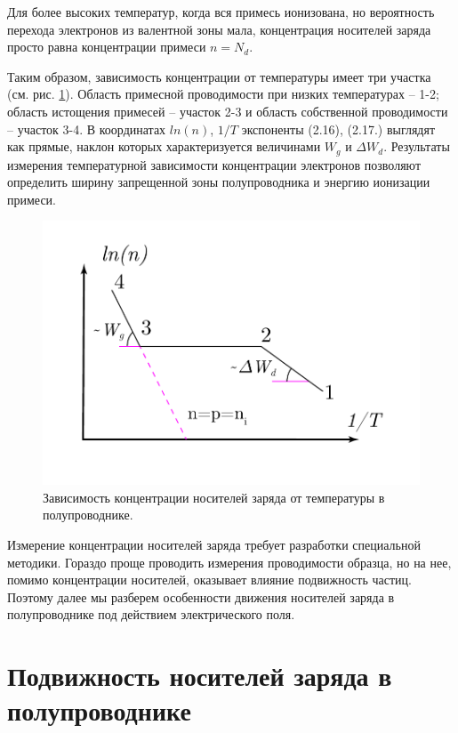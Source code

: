 		Для более высоких температур, когда вся примесь ионизована, но вероятность перехода электронов из валентной зоны мала,
		концентрация носителей заряда просто равна концентрации примеси $n=N_d$. 
		
		
		Таким образом, зависимость концентрации от температуры имеет три участка (см. рис. \ref{fig:2.2}). Область примесной проводимости
		при низких температурах – 1-2; область истощения примесей – участок 2-3 и область собственной проводимости – участок
		3-4. В координатах $ln(n)$, $1/T$ экспоненты (2.16), (2.17.) выглядят как прямые, наклон которых характеризуется величинами
		$W_g$ и $\Delta W_d$. Результаты измерения температурной зависимости концентрации электронов позволяют определить ширину
		запрещенной зоны полупроводника и энергию ионизации примеси.
		
		\begin{figure}[h!]
			\centering
			\includegraphics[width = .7\linewidth]{img/23}
			\caption{Зависимость концентрации носителей заряда от температуры в полупроводнике.}
			\label{fig:2.2}
		\end{figure}
		
		Измерение концентрации носителей заряда требует разработки специальной методики. Гораздо проще проводить измерения
		проводимости образца, но на нее, помимо концентрации носителей, оказывает влияние подвижность частиц. Поэтому далее мы
		разберем особенности движения носителей заряда в полупроводнике под действием электрического поля. 
		
		
		\section{Подвижность носителей заряда в полупроводнике}
		
